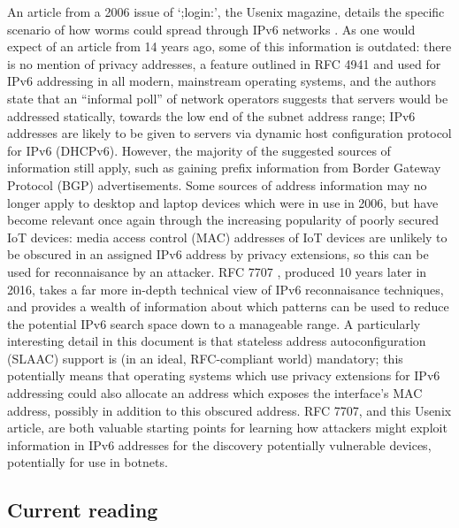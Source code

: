 \documentclass[10pt,sigconf]{acmart}
\begin{document}
An article from a 2006 issue of `;login:', the Usenix magazine, details the specific scenario of how worms could spread through IPv6 networks \cite{bellovin2006}.
As one would expect of an article from 14 years ago, some of this information is outdated:
there is no mention of privacy addresses, a feature outlined in RFC 4941 \cite{rfc-privacy-ext} and used for IPv6 addressing in all modern, mainstream operating systems,
and the authors state that an ``informal poll'' of network operators suggests that servers would be addressed statically, towards the low end of the subnet address range;
IPv6 addresses are likely to be given to servers via dynamic host configuration protocol for IPv6 (DHCPv6).
However, the majority of the suggested sources of information still apply, such as gaining prefix information from Border Gateway Protocol (BGP) advertisements.
Some sources of address information may no longer apply to desktop and laptop devices which were in use in 2006, but have become relevant once again through the increasing popularity of poorly secured IoT devices:
media access control (MAC) addresses of IoT devices are unlikely to be obscured in an assigned IPv6 address by privacy extensions, so this can be used for reconnaisance by an attacker.
RFC 7707 \cite{rfc-ipv6-rec}, produced 10 years later in 2016, takes a far more in-depth technical view of IPv6 reconnaisance techniques, and provides a wealth of information about which patterns can be used to reduce the potential IPv6 search space down to a manageable range.
A particularly interesting detail in this document is that stateless address autoconfiguration (SLAAC) support is (in an ideal, RFC-compliant world) mandatory;
this potentially means that operating systems which use privacy extensions for IPv6 addressing could also allocate an address which exposes the interface's MAC address, possibly in addition to this obscured address.
RFC 7707, and this Usenix article, are both valuable starting points for learning how attackers might exploit information in IPv6 addresses for the discovery potentially vulnerable devices, potentially for use in botnets.


\subsection{Current reading}
\end{document}
